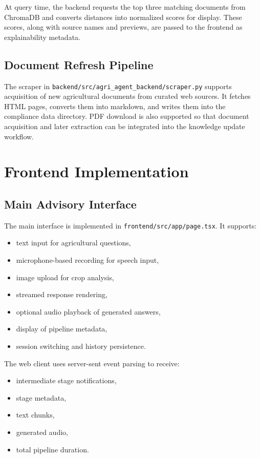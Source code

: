 \documentclass[11pt,a4paper]{article}
\begin{document}
At query time, the backend requests the top three matching documents from ChromaDB and converts distances into normalized scores for display. These scores, along with source names and previews, are passed to the frontend as explainability metadata.

\subsection{Document Refresh Pipeline}

The scraper in \texttt{backend/src/agri\_agent\_backend/scraper.py} supports acquisition of new agricultural documents from curated web sources. It fetches HTML pages, converts them into markdown, and writes them into the compliance data directory. PDF download is also supported so that document acquisition and later extraction can be integrated into the knowledge update workflow.

\section{Frontend Implementation}

\subsection{Main Advisory Interface}

The main interface is implemented in \texttt{frontend/src/app/page.tsx}. It supports:

\begin{itemize}
  \item text input for agricultural questions,
  \item microphone-based recording for speech input,
  \item image upload for crop analysis,
  \item streamed response rendering,
  \item optional audio playback of generated answers,
  \item display of pipeline metadata,
  \item session switching and history persistence.
\end{itemize}

The web client uses server-sent event parsing to receive:

\begin{itemize}
  \item intermediate stage notifications,
  \item stage metadata,
  \item text chunks,
  \item generated audio,
  \item total pipeline duration.
\end{itemize}
\end{document}
